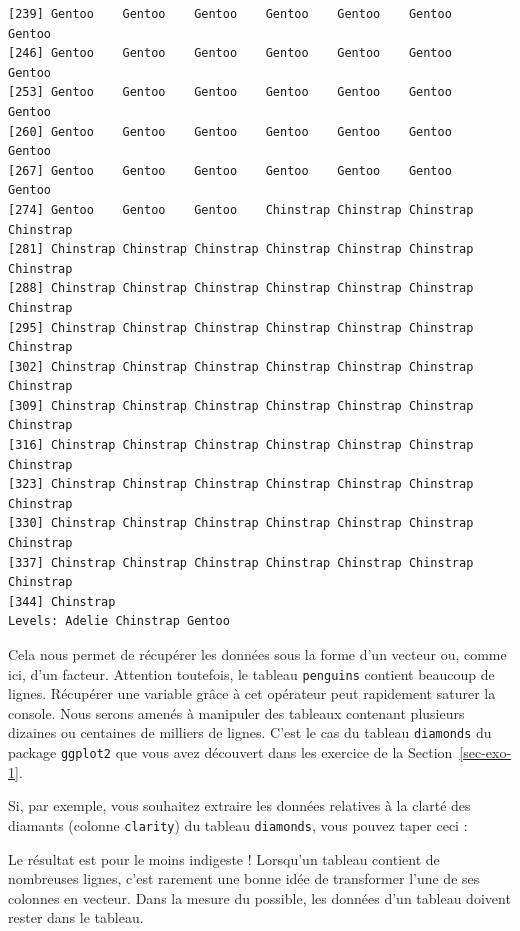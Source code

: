 \documentclass[
  a4paper,
  DIV=11,
  numbers=noendperiod,
  oneside]{scrreprt}
\newenvironment{Shaded}{}{}
\newcommand{\FunctionTok}[1]{\textcolor[rgb]{0.44,0.26,0.76}{#1}}
\newcommand{\NormalTok}[1]{\textcolor[rgb]{0.14,0.16,0.18}{#1}}
\newcommand{\SpecialCharTok}[1]{\textcolor[rgb]{0.00,0.36,0.77}{#1}}
\begin{document}
\begin{verbatim}
[239] Gentoo    Gentoo    Gentoo    Gentoo    Gentoo    Gentoo    Gentoo   
[246] Gentoo    Gentoo    Gentoo    Gentoo    Gentoo    Gentoo    Gentoo   
[253] Gentoo    Gentoo    Gentoo    Gentoo    Gentoo    Gentoo    Gentoo   
[260] Gentoo    Gentoo    Gentoo    Gentoo    Gentoo    Gentoo    Gentoo   
[267] Gentoo    Gentoo    Gentoo    Gentoo    Gentoo    Gentoo    Gentoo   
[274] Gentoo    Gentoo    Gentoo    Chinstrap Chinstrap Chinstrap Chinstrap
[281] Chinstrap Chinstrap Chinstrap Chinstrap Chinstrap Chinstrap Chinstrap
[288] Chinstrap Chinstrap Chinstrap Chinstrap Chinstrap Chinstrap Chinstrap
[295] Chinstrap Chinstrap Chinstrap Chinstrap Chinstrap Chinstrap Chinstrap
[302] Chinstrap Chinstrap Chinstrap Chinstrap Chinstrap Chinstrap Chinstrap
[309] Chinstrap Chinstrap Chinstrap Chinstrap Chinstrap Chinstrap Chinstrap
[316] Chinstrap Chinstrap Chinstrap Chinstrap Chinstrap Chinstrap Chinstrap
[323] Chinstrap Chinstrap Chinstrap Chinstrap Chinstrap Chinstrap Chinstrap
[330] Chinstrap Chinstrap Chinstrap Chinstrap Chinstrap Chinstrap Chinstrap
[337] Chinstrap Chinstrap Chinstrap Chinstrap Chinstrap Chinstrap Chinstrap
[344] Chinstrap
Levels: Adelie Chinstrap Gentoo
\end{verbatim}

Cela nous permet de récupérer les données sous la forme d'un vecteur ou,
comme ici, d'un facteur. Attention toutefois, le tableau
\texttt{penguins} contient beaucoup de lignes. Récupérer une variable
grâce à cet opérateur peut rapidement saturer la console. Nous serons
amenés à manipuler des tableaux contenant plusieurs dizaines ou
centaines de milliers de lignes. C'est le cas du tableau
\texttt{diamonds} du package \texttt{ggplot2} que vous avez découvert
dans les exercice de la Section~\ref{sec-exo-1}.

Si, par exemple, vous souhaitez extraire les données relatives à la
clarté des diamants (colonne \texttt{clarity}) du tableau
\texttt{diamonds}, vous pouvez taper ceci :

\begin{Shaded}
\end{Shaded}

Le résultat est pour le moins indigeste ! Lorsqu'un tableau contient de
nombreuses lignes, c'est rarement une bonne idée de transformer l'une de
ses colonnes en vecteur. Dans la mesure du possible, les données d'un
tableau doivent rester dans le tableau.
\end{document}
